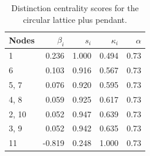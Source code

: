\begin{table}
\centering
\caption{\label{tab:circularlatticependant}Distinction centrality scores for the circular lattice plus pendant.}
\centering
\begin{tabular}[t]{lrrrr}
\toprule
Nodes & $\beta_i$ & $s_i$ & $\kappa_i$ & $\alpha$\\
\midrule
1 & 0.236 & 1.000 & 0.494 & 0.73\\
6 & 0.103 & 0.916 & 0.567 & 0.73\\
5, 7 & 0.076 & 0.920 & 0.595 & 0.73\\
4, 8 & 0.059 & 0.925 & 0.617 & 0.73\\
2, 10 & 0.052 & 0.947 & 0.639 & 0.73\\
3, 9 & 0.052 & 0.942 & 0.635 & 0.73\\
11 & -0.819 & 0.248 & 1.000 & 0.73\\
\bottomrule
\end{tabular}
\end{table}
